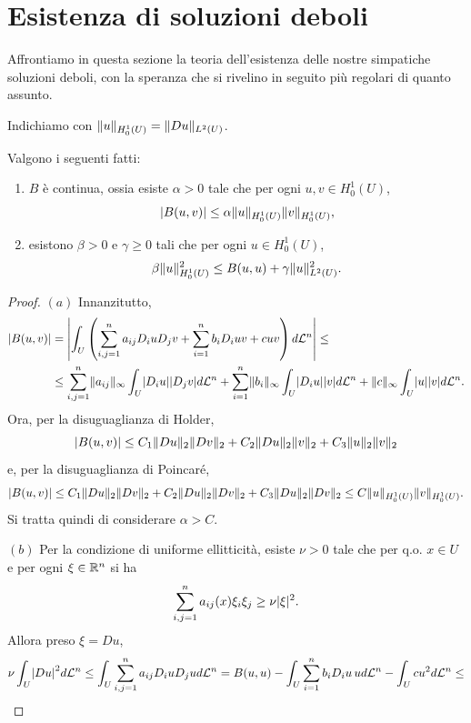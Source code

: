 \section{Esistenza di soluzioni deboli}
Affrontiamo in questa sezione la teoria dell'esistenza delle nostre simpatiche soluzioni deboli, con la speranza che si rivelino in seguito più regolari di quanto assunto.
\begin{notazione}
	Indichiamo con $\norm{u}_{H^1_0(U)} = \norm{Du}_{L^2(U)}$.
\end{notazione} 
\begin{proposizione}\label{stimesuB}
	Valgono i seguenti fatti:
	\begin{enumerate}[$(a)$]
		\item $B$ è continua, ossia esiste $\alpha>0$ tale che per ogni $u,v \in H^1_0(U)$,
		\[ \abs*{B(u,v)} \le \alpha\norm{u}_{H^1_0(U)}\norm{v}_{H^1_0(U)}, \]
		\item esistono $\beta > 0$ e $\gamma \ge 0$ tali che per ogni $u \in H^1_0(U)$,
		\[ 	\beta\norm{u}_{H^1_0(U)}^2 \le B(u,u) + \gamma\norm{u}_{L^2(U)}^2. \]
	\end{enumerate}
	\begin{proof}\hfill
		\par\noindent
		$(a)$ Innanzitutto,
		\begin{align*}
			\abs*{B(u,v)} &= \abs*{\int_U \left( \sum_{i,j=1}^{n}a_{ij}D_iuD_{j}v + \sum_{i=1}^{n}b_i D_iuv + cuv\right) d\mathcal{L}^n} \le \\
			&\le \sum_{i,j=1}^{n} \norm{a_{ij}}_\infty \int_U \abs*{D_iu} \abs*{D_jv}d\mathcal{L}^n + \sum_{i=1}^{n}\norm{b_{i}}_\infty\int_U\abs*{D_iu} \abs*{v}d\mathcal{L}^n + \norm{c}_\infty\int_U\abs{u}\abs{v}d\mathcal{L}^n.
		\end{align*}
		Ora, per la disuguaglianza di Holder,
		\[	\abs*{B(u,v)}  \le C_1 \norm{Du}_2\norm{Dv}_2 + C_2 \norm{Du}_2\norm{v}_2 + C_3 \norm{u}_2\norm{v}_2  \]
		e, per la disuguaglianza di Poincaré,
		\[	\abs*{B(u,v)}  \le  C_1 \norm{Du}_2\norm{Dv}_2 + C_2 \norm{Du}_2\norm{Dv}_2 + C_3 \norm{Du}_2\norm{Dv}_2 \le C\norm{u}_{H^1_0(U)}\norm{v}_{H^1_0(U)}.  \]
		Si tratta quindi di considerare $\alpha > C$.
		\par\noindent
		$(b)$ Per la condizione di uniforme ellitticità, esiste $\nu> 0$ tale che per q.o. $ x \in U$ e per ogni $\xi \in \R^n$ si ha
		\[ \sum_{i,j=1}^n a_{ij}(x)\xi_i\xi_j \ge \nu\abs{\xi}^2. \]
		Allora preso $\xi = Du$,
		\begin{align*}
			\nu \int_U \abs*{Du}^2 d\mathcal{L}^n &\le \int_U \sum_{i,j=1}^n a_{ij}D_iuD_ju d\mathcal{L}^n = B(u,u) - \int_U\sum_{i=1}^n b_iD_iu \, ud\mathcal{L}^n -\int_Ucu^2 d\mathcal{L}^n \le \\

\end{align*}
\end{proof}
\end{proposizione}
